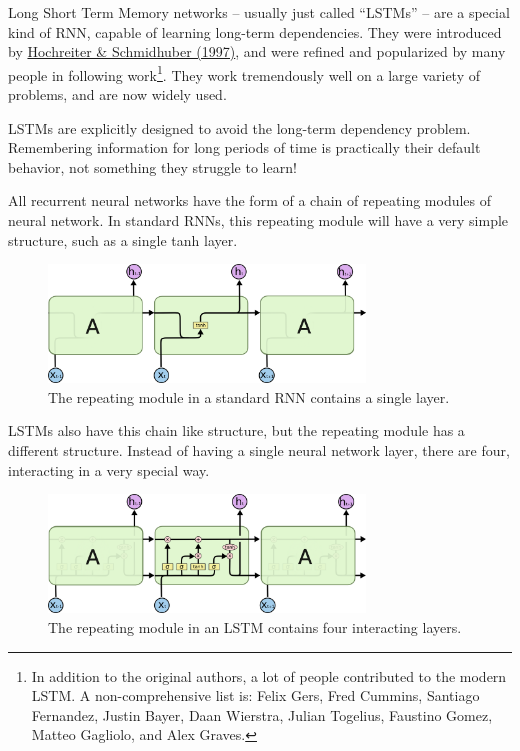 Long Short Term Memory networks – usually just called “LSTMs” – are a special kind of RNN, capable of learning long-term dependencies. They were introduced by \href{http://www.bioinf.jku.at/publications/older/2604.pdf}{Hochreiter \& Schmidhuber (1997)}, and were refined and popularized by many people in following work\footnote{In addition to the original authors, a lot of people contributed to the modern LSTM. A non-comprehensive list is: Felix Gers, Fred Cummins, Santiago Fernandez, Justin Bayer, Daan Wierstra, Julian Togelius, Faustino Gomez, Matteo Gagliolo, and Alex Graves.}. They work tremendously well on a large variety of problems, and are now widely used.

LSTMs are explicitly designed to avoid the long-term dependency problem. Remembering information for long periods of time is practically their default behavior, not something they struggle to learn!

All recurrent neural networks have the form of a chain of repeating modules of neural network. In standard RNNs, this repeating module will have a very simple structure, such as a single tanh layer.

\begin{figure}[htbp]
	\centering
	\includegraphics[width=0.75\textwidth]{fig/4.png}
	\caption{The repeating module in a standard RNN contains a single layer.}
\end{figure}

LSTMs also have this chain like structure, but the repeating module has a different structure. Instead of having a single neural network layer, there are four, interacting in a very special way.

\begin{figure}[htbp]
	\centering
	\includegraphics[width=0.75\textwidth]{fig/5.png}
	\caption{The repeating module in an LSTM contains four interacting layers.}
\end{figure}

